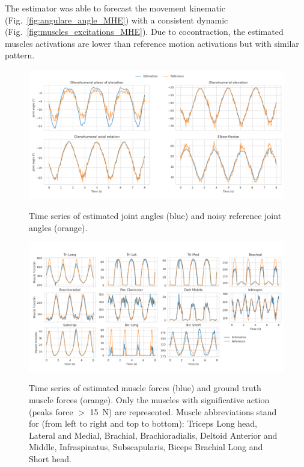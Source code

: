 The estimator was able to forecast the movement kinematic (Fig.~\ref{fig:angulare_angle_MHE}) with a consistent dynamic (Fig.~\ref{fig:muscles_excitations_MHE}). Due to cocontraction, the estimated muscles activations are lower than reference motion activations but with similar pattern. 
\begin{figure}[t!] 
\centering 
\includegraphics[width=\textwidth]{figures/joint_angles_MHE.pdf}\\ 
\caption{Time series of estimated joint angles (blue) and noisy reference joint angles (orange).} 
\label{fig:joint_angles_MHE} 
\end{figure} 

\begin{figure}[t!] 
\centering 
\includegraphics[width=\textwidth]{figures/Muscle_Forces_MHE.pdf}\\ 
\caption{Time series of estimated muscle forces (blue) and ground truth muscle forces (orange). 
Only the muscles with significative action (peaks force $>$ 15~N) are represented.
Muscle abbreviations stand for (from left to right and top to bottom): Triceps Long head, Lateral and Medial, Brachial, Brachioradialis, Deltoid Anterior and Middle, Infraspinatus, Subscapularis, Biceps Brachial Long and Short head.} 
\label{fig:muscle_forces_MHE} 
\end{figure} 
